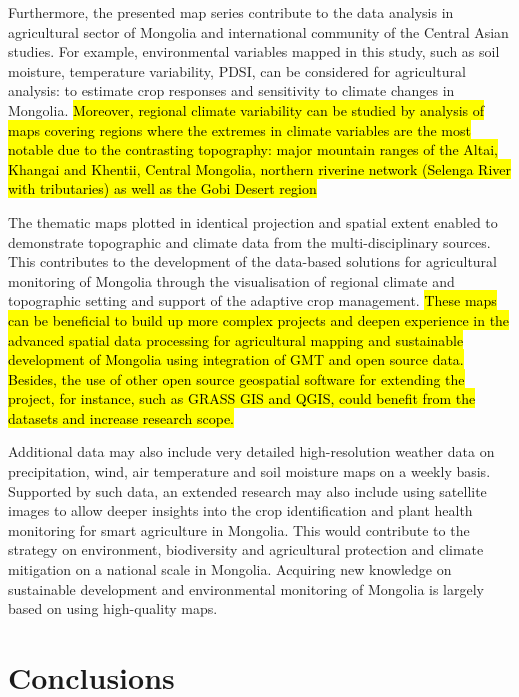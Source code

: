 \documentclass[geosciences,article,submit,pdftex,moreauthors]{Definitions/mdpi}
\begin{document}
Furthermore, the presented map series contribute to the data analysis in agricultural sector of Mongolia and international community of the Central Asian studies. For example, environmental variables mapped in this study, such as soil moisture, temperature variability, PDSI, can be considered for agricultural analysis: to estimate crop responses and sensitivity to climate changes in Mongolia. \hl{Moreover, regional climate variability can be studied by analysis of maps covering regions where the extremes in climate variables are the most notable due to the contrasting topography: major mountain ranges of the Altai, Khangai and Khentii, Central Mongolia, northern riverine network (Selenga River with tributaries) as well as the Gobi Desert region}

The thematic maps plotted in identical projection and spatial extent enabled to demonstrate topographic and climate data from the multi-disciplinary sources. This contributes to the development of the data-based solutions for agricultural monitoring of Mongolia through the visualisation of regional climate and topographic setting and support of the adaptive crop management. \hl{These maps can be beneficial to build up more complex projects and deepen experience in the advanced spatial data processing for agricultural mapping and sustainable development of Mongolia using integration of GMT and open source data. Besides, the use of other open source geospatial software for extending the project, for instance, such as GRASS GIS and QGIS, could benefit from the datasets and increase research scope.}

Additional data may also include very detailed high-resolution weather data on precipitation, wind, air temperature and soil moisture maps on a weekly basis. Supported by such data, an extended research may also include using satellite images to allow deeper insights into the crop identification and plant health monitoring for smart agriculture in Mongolia. This would contribute to the strategy on environment, biodiversity and agricultural protection and climate mitigation on a national scale in Mongolia. Acquiring new knowledge on sustainable development and environmental monitoring of Mongolia is largely based on using high-quality maps.

\section{Conclusions}
\end{document}
